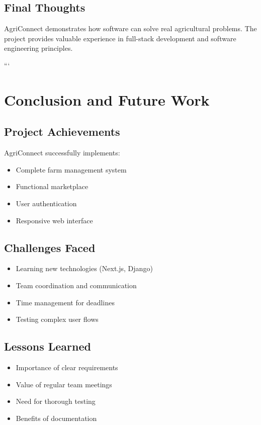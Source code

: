 \subsection{Final Thoughts}
AgriConnect demonstrates how software can solve real agricultural problems. The project provides valuable experience in full-stack development and software engineering principles.

```
\section{Conclusion and Future Work}

\subsection{Project Achievements}
AgriConnect successfully implements:
\begin{itemize}[leftmargin=*]
	\item Complete farm management system
	\item Functional marketplace
	\item User authentication
	\item Responsive web interface
\end{itemize}

\subsection{Challenges Faced}
\begin{itemize}[leftmargin=*]
	\item Learning new technologies (Next.js, Django)
	\item Team coordination and communication
	\item Time management for deadlines
	\item Testing complex user flows
\end{itemize}

\subsection{Lessons Learned}
\begin{itemize}[leftmargin=*]
	\item Importance of clear requirements
	\item Value of regular team meetings
	\item Need for thorough testing
	\item Benefits of documentation
\end{itemize}

